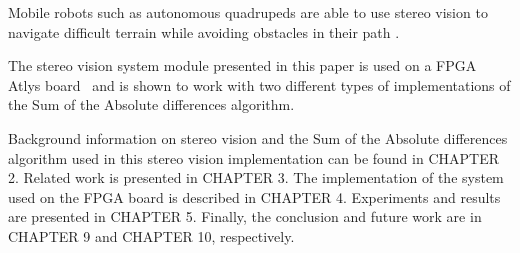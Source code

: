 Mobile robots such as autonomous quadrupeds are able to use stereo vision to navigate difficult terrain while avoiding obstacles in their path \cite{quadRobot}.

The stereo vision system module presented in this paper is used on a FPGA Atlys board~\cite{atlysBoard} and is shown to work with two different types of implementations of the Sum of the Absolute differences algorithm. 

Background information on stereo vision and the Sum of the Absolute differences algorithm used in this stereo vision implementation can be found in CHAPTER 2. Related work is presented in CHAPTER 3. The implementation of the system used on the FPGA board is described in CHAPTER 4. Experiments and results are presented in CHAPTER 5. Finally, the conclusion and future work are in CHAPTER 9 and CHAPTER 10, respectively.